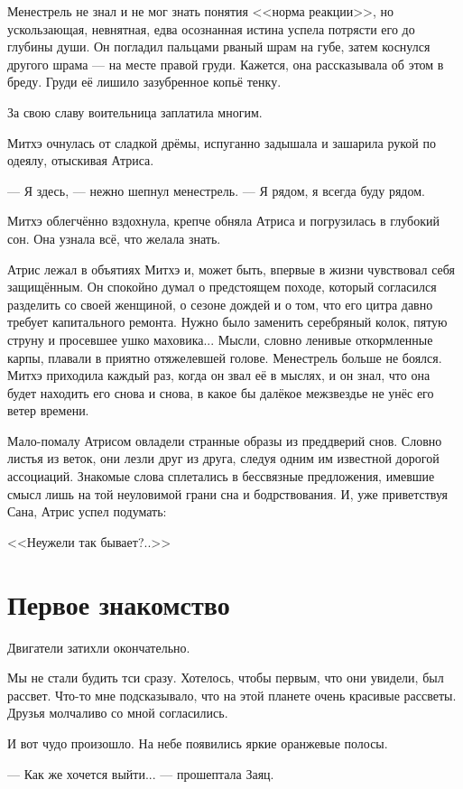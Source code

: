 Менестрель не знал и не мог знать понятия <<норма реакции>>, но ускользающая, невнятная, едва осознанная истина успела потрясти его до глубины души.
Он погладил пальцами рваный шрам на губе, затем коснулся другого шрама --- на месте правой груди.
Кажется, она рассказывала об этом в бреду.
Груди её лишило зазубренное копьё тенку.

За свою славу воительница заплатила многим.

Митхэ очнулась от сладкой дрёмы, испуганно задышала и зашарила рукой по одеялу, отыскивая Атриса.

--- Я здесь, --- нежно шепнул менестрель.
--- Я рядом, я всегда буду рядом.

Митхэ облегчённо вздохнула, крепче обняла Атриса и погрузилась в глубокий сон.
Она узнала всё, что желала знать.

Атрис лежал в объятиях Митхэ и, может быть, впервые в жизни чувствовал себя защищённым.
Он спокойно думал о предстоящем походе, который согласился разделить со своей женщиной, о сезоне дождей и о том, что его цитра давно требует капитального ремонта.
Нужно было заменить серебряный колок, пятую струну и просевшее ушко маховика...
Мысли, словно ленивые откормленные карпы, плавали в приятно отяжелевшей голове.
Менестрель больше не боялся.
Митхэ приходила каждый раз, когда он звал её в мыслях, и он знал, что она будет находить его снова и снова, в какое бы далёкое межзвездье не унёс его ветер времени.

Мало-помалу Атрисом овладели странные образы из преддверий снов.
Словно листья из веток, они лезли друг из друга, следуя одним им известной дорогой ассоциаций.
Знакомые слова сплетались в бессвязные предложения, имевшие смысл лишь на той неуловимой грани сна и бодрствования.
И, уже приветствуя Сана, Атрис успел подумать:

<<Неужели так бывает?..>>

\section{Первое знакомство}

Двигатели затихли окончательно.

Мы не стали будить тси сразу.
Хотелось, чтобы первым, что они увидели, был рассвет.
Что-то мне подсказывало, что на этой планете очень красивые рассветы.
Друзья молчаливо со мной согласились.

И вот чудо произошло.
На небе появились яркие оранжевые полосы.

--- Как же хочется выйти... --- прошептала Заяц.

